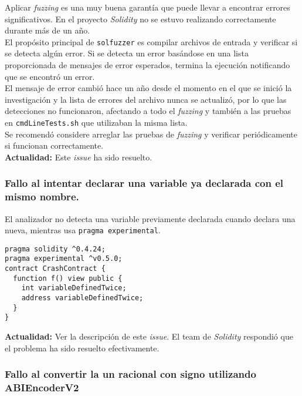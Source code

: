 Aplicar \textit{fuzzing} es una muy buena garantía que puede llevar a encontrar errores significativos. En el proyecto \textit{Solidity} no se estuvo realizando correctamente durante más de un año.\\

El propósito principal de \texttt{solfuzzer} es compilar archivos de entrada y verificar si se detecta algún error. Si se detecta un error basándose en una lista proporcionada de mensajes de error esperados, termina la ejecución notificando que se encontró un error.\\

El mensaje de error cambió hace un año desde el momento en el que se inició la investigación y la lista de errores del archivo nunca se actualizó, por lo que las detecciones no funcionaron, afectando a todo el \textit{fuzzing} y también a las pruebas en \texttt{cmdLineTests.sh}\cite{GHcmdlinetests} que utilizaban la misma lista.\\

Se recomendó considere arreglar las pruebas de \textit{fuzzing} y verificar periódicamente si funcionan correctamente.\\

\textbf{Actualidad:} Este \textit{issue}\cite{GHI4458} ha sido resuelto\cite{GHPR4461}.\\


\subsubsection{Fallo al intentar declarar una variable ya declarada con el mismo nombre.}

El analizador no detecta una variable previamente declarada cuando declara una nueva, mientras usa \texttt{pragma experimental}.\\

\begin{lstlisting}[language=Solidity, caption={Código de ejemplo variable mismo nombre.}]
pragma solidity ^0.4.24;
pragma experimental ^v0.5.0;
contract CrashContract {     
  function f() view public {
    int variableDefinedTwice;
    address variableDefinedTwice;
  }
}
\end{lstlisting}

\textbf{Actualidad:} Ver la descripción de este \textit{issue}\cite{GHI4705}. El team de \textit{Solidity} respondió que el problema ha sido resuelto efectivamente.\\

\subsubsection{Fallo al convertir la un racional con signo utilizando ABIEncoderV2}


